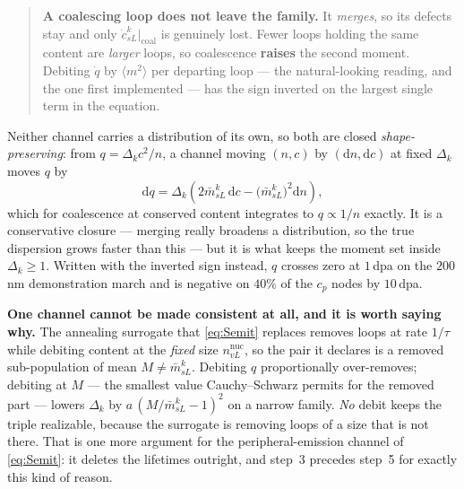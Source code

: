 \documentclass{article}
\begin{document}
\begin{quote}
\textbf{A coalescing loop does not leave the family.} It \emph{merges}, so its
defects stay and only $\dot c^k_{sL}|_{\mathrm{coal}}$ is genuinely lost. Fewer
loops holding the same content are \emph{larger} loops, so coalescence
\textbf{raises} the second moment. Debiting $\dot q$ by
$\langle m^2\rangle$ per departing loop --- the natural-looking reading, and the
one first implemented --- has the sign inverted on the largest single term in the
equation.
\end{quote}

Neither channel carries a distribution of its own, so both are closed
\emph{shape-preserving}: from $q=\Delta_k c^2/n$, a channel moving $(n,c)$ by
$(\mathrm dn,\mathrm dc)$ at fixed $\Delta_k$ moves $q$ by
\begin{equation}
  \mathrm dq=\Delta_k\left(2\bar m^k_{sL}\,\mathrm dc
    -\bigl(\bar m^k_{sL}\bigr)^{2}\mathrm dn\right),
  \label{eq:shapepreserving}
\end{equation}
which for coalescence at conserved content integrates to $q\propto1/n$ exactly.
It is a conservative closure --- merging really broadens a distribution, so the
true dispersion grows faster than this --- but it is what keeps the moment set
inside $\Delta_k\ge1$. Written with the inverted sign instead, $q$ crosses zero
at $1$\,dpa on the $200$\,nm demonstration march and is negative on $40\%$ of
the $c_p$ nodes by $10$\,dpa.

\textbf{One channel cannot be made consistent at all, and it is worth saying
why.} The annealing surrogate that \cref{eq:Semit} replaces removes loops at rate
$1/\tau$ while debiting content at the \emph{fixed} size $n^{\mathrm{nuc}}_{vL}$,
so the pair it declares is a removed sub-population of mean $M\ne\bar m^k_{sL}$.
Debiting $q$ proportionally over-removes; debiting at $M$ --- the smallest value
Cauchy--Schwarz permits for the removed part --- lowers $\Delta_k$ by
$a\,(M/\bar m^k_{sL}-1)^2$ on a narrow family. \emph{No} debit keeps the triple
realizable, because the surrogate is removing loops of a size that is not there.
That is one more argument for the peripheral-emission channel of
\cref{eq:Semit}: it deletes the lifetimes outright, and step~3 precedes step~5
for exactly this kind of reason.
\end{document}
